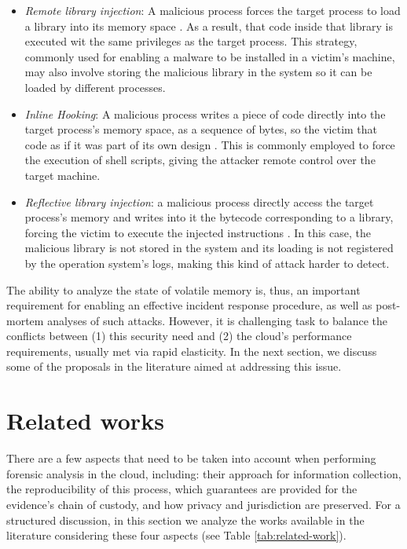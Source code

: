 \documentclass[twocolumn, notitlepage]{bmcart}%
\begin{document}
\begin{itemize}
 \item \textit{Remote library injection}: A malicious process forces the target process to load a library into its memory space \cite{Miller_Remote_Library_Injection:2004}.
 As a result, that code inside that library is executed wit the same privileges as the target process. 
 This strategy, commonly used for enabling a malware to be installed in a victim's machine, may also involve storing the malicious library in the system so it can be loaded by different processes.
 

 \item \textit{Inline Hooking}: A malicious process writes a piece of code directly into the target process's memory space, as a sequence of bytes, so the victim that code as if it was part of its own design \cite{inline-hooking:2008}.
%
This is commonly employed to force the execution of shell scripts, giving the attacker remote control over the target machine.


 \item \textit{Reflective library injection}: a malicious process directly access the target process's memory and writes into it the bytecode corresponding to a library, forcing the victim to execute the injected instructions \cite{reflective-lib-injection:2008}.
 In this case, the malicious library is not stored in the system and its loading is not registered by the operation system's logs, making this kind of attack harder to detect.
\end{itemize}	



The ability to analyze the state of volatile memory is, thus, an important requirement for enabling an effective incident response procedure, as well as post-mortem analyses of such attacks.
%
However, it is challenging task to balance the conflicts between (1) this security need and (2) the cloud's performance requirements, usually met via rapid elasticity. 
%
In the next section, we discuss some of the proposals in the literature aimed at addressing this issue.


\section*{Related works}
\label{sec:related}

There are a few aspects that need to be taken into account when performing forensic analysis in the cloud, including: their approach for information collection, the reproducibility of this process, which guarantees are provided for the evidence's chain of custody, and how privacy and jurisdiction are preserved.
%
For a structured discussion, in this section we analyze the works available in the literature considering these four aspects (see Table \ref{tab:related-work}).
\end{document}
